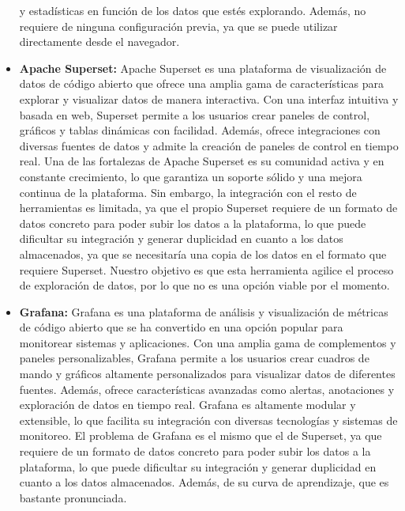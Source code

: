 \begin{itemize}
    y estadísticas en función de los datos que estés explorando. Además, no requiere de ninguna configuración
    previa, ya que se puede utilizar directamente desde el navegador.
    \item \textbf{Apache Superset:} Apache Superset es una plataforma de visualización de datos de código abierto 
    que ofrece una amplia gama de características para explorar y visualizar datos de manera interactiva. Con una 
    interfaz intuitiva y basada en web, Superset permite a los usuarios crear paneles de control, gráficos y tablas 
    dinámicas con facilidad. Además, ofrece integraciones con diversas fuentes de datos y admite la creación de 
    paneles de control en tiempo real. Una de las fortalezas de Apache Superset es su comunidad activa y en constante 
    crecimiento, lo que garantiza un soporte sólido y una mejora continua de la plataforma. Sin embargo, la integración
    con el resto de herramientas es limitada, ya que el propio Superset requiere de un formato de datos concreto para
    poder subir los datos a la plataforma, lo que puede dificultar su integración y generar duplicidad en cuanto a los
    datos almacenados, ya que se necesitaría una copia de los datos en el formato que requiere Superset. Nuestro objetivo
    es que esta herramienta agilice el proceso de exploración de datos, por lo que no es una opción viable por el momento.
    \item \textbf{Grafana:} Grafana es una plataforma de análisis y visualización de métricas de código abierto que 
    se ha convertido en una opción popular para monitorear sistemas y aplicaciones. Con una amplia gama de complementos 
    y paneles personalizables, Grafana permite a los usuarios crear cuadros de mando y gráficos altamente personalizados 
    para visualizar datos de diferentes fuentes. Además, ofrece características avanzadas como alertas, anotaciones y 
    exploración de datos en tiempo real. Grafana es altamente modular y extensible, lo que facilita su integración con 
    diversas tecnologías y sistemas de monitoreo. El problema de Grafana es el mismo que el de Superset, ya que requiere
    de un formato de datos concreto para poder subir los datos a la plataforma, lo que puede dificultar su integración y
    generar duplicidad en cuanto a los datos almacenados. Además, de su curva de aprendizaje, que es bastante pronunciada.
\end{itemize}

